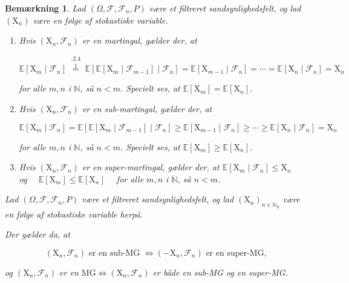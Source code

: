 \documentclass{article}
\newcommand{\1}{\mathbbm{1}}
\theoremstyle{boxed}
\newtheorem{remark}[theorem]{Bemærkning}
\begin{document}
\begin{remark}
    Lad $\left(\Omega, \mathcal{F}, \mathcal{F}_n, P\right)$ være et filtreret sandsynlighedsfelt, og lad $\left(\mathrm{X}_n\right)$ være en følge af stokastiske variable.
    \begin{enumerate}
        \item Hvis $\left(\mathrm{X}_n, \mathcal{F}_n\right)$ er en martingal, gælder der, at
        
        $$
        \mathbb{E}\left[\mathrm{X}_m \mid \mathcal{F}_n\right] \stackrel{\substack{.2 .4}}{\stackrel{1}{=}} \mathbb{E}\left[\mathbb{E}\left[\mathrm{X}_m \mid \mathcal{F}_{m-1}\right] \mid \mathcal{F}_n\right]=\mathbb{E}\left[\mathrm{X}_{m-1} \mid \mathcal{F}_n\right]=\cdots=\mathbb{E}\left[\mathrm{X}_n \mid \mathcal{F}_n\right]=\mathrm{X}_n
        $$
        
        for alle $m, n$ i $\mathbb{N}$, så $n<m$. Specielt ses, at $\mathbb{E}\left[\mathrm{X}_m\right]=\mathbb{E}\left[\mathrm{X}_n\right]$.
        \item Hvis $\left(\mathrm{X}_n, \mathcal{F}_n\right)$ er en sub-martingal, gælder der, at
        
        $$
        \mathbb{E}\left[\mathrm{X}_m \mid \mathcal{F}_n\right]=\mathbb{E}\left[\mathbb{E}\left[\mathrm{X}_m \mid \mathcal{F}_{m-1}\right] \mid \mathcal{F}_n\right] \geq \mathbb{E}\left[\mathrm{X}_{m-1} \mid \mathcal{F}_n\right] \geq \cdots \geq \mathbb{E}\left[\mathrm{X}_n \mid \mathcal{F}_n\right]=\mathrm{X}_n
        $$
        
        for alle $m, n$ i $\mathbb{N}$, så $n<m$. Specielt ses, at $\mathbb{E}\left[\mathrm{X}_m\right] \geq \mathbb{E}\left[\mathrm{X}_n\right]$.
        \item Hvis $\left(\mathrm{X}_n, \mathcal{F}_n\right)$ er en super-martingal, gælder der, at $\mathbb{E}\left[\mathrm{X}_m \mid \mathcal{F}_n\right] \leq \mathrm{X}_n \quad$ og $\quad \mathbb{E}\left[\mathrm{X}_m\right] \leq \mathbb{E}\left[\mathrm{X}_n\right] \quad$ for alle $m, n$ i $\mathbb{N}$, så $n<m$.
    \end{enumerate}
    Lad $\left(\Omega, \mathcal{F}, \mathcal{F}_n, P\right)$ være et filtreret sandsynlighedsfelt, og lad $\left(\mathrm{X}_n\right)_{n \in \mathbb{N}_0}$ være en følge af stokastiske variable herpå.

Der gælder da, at

$$
\left(\mathrm{X}_n, \mathcal{F}_n\right) \text { er en sub-MG } \Longleftrightarrow\left(-\mathrm{X}_n, \mathcal{F}_n\right) \text { er en super-MG, }
$$

og
$\left(\mathrm{X}_n, \mathcal{F}_n\right)$ er en $\mathrm{MG} \Longleftrightarrow\left(\mathrm{X}_n, \mathcal{F}_n\right)$ er både en sub-MG og en super-MG.
\end{remark}
\end{document}

